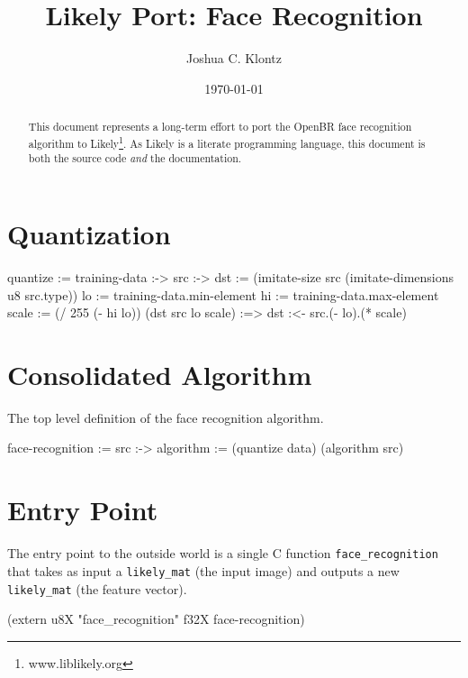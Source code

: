 \documentclass{article}
\title{Likely Port: Face Recognition}
\author{Joshua C. Klontz}
\date{\today}
\newenvironment{likely}
{ \verbatim }
{ \endverbatim }
\begin{document}
\maketitle

\begin{abstract}
This document represents a long-term effort to port the OpenBR face recognition algorithm to Likely\footnote{www.liblikely.org}.
As Likely is a literate programming language, this document is both the source code \emph{and} the documentation.
\end{abstract}

\section{Quantization}
\begin{likely}
quantize :=
  training-data :->
    src :->
    {
      dst := (imitate-size src (imitate-dimensions u8 src.type))
      lo := training-data.min-element
      hi := training-data.max-element
      scale := (/ 255 (- hi lo))
      (dst src lo scale) :=>
        dst :<- src.(- lo).(* scale)
    }
\end{likely}

\section{Consolidated Algorithm}
The top level definition of the face recognition algorithm.

\begin{likely}
face-recognition :=
  src :->
  {
    algorithm := (quantize data)
    (algorithm src)
  }
\end{likely}

\section{Entry Point}
The entry point to the outside world is a single C function \texttt{face\_recognition} that takes as input a \texttt{likely\_mat} (the input image) and outputs a new \texttt{likely\_mat} (the feature vector).

\begin{likely}
(extern u8X "face_recognition" f32X face-recognition)
\end{likely}
\end{document}
